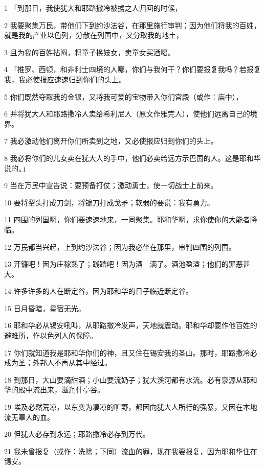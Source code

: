 \par 1 「到那日，我使犹大和耶路撒冷被掳之人归回的时候，
\par 2 我要聚集万民，带他们下到约沙法谷，在那里施行审判；因为他们将我的百姓，就是我的产业以色列，分散在列国中，又分取我的地土，
\par 3 且为我的百姓拈阄，将童子换妓女，卖童女买酒喝。
\par 4 「推罗、西顿，和非利士四境的人哪，你们与我何干？你们要报复我吗？若报复我，我必使报应速速归到你们的头上。
\par 5 你们既然夺取我的金银，又将我可爱的宝物带入你们宫殿（或作：庙中），
\par 6 并将犹大人和耶路撒冷人卖给希利尼人（原文作雅完人），使他们远离自己的境界。
\par 7 我必激动他们离开你们所卖到之地，又必使报应归到你们的头上。
\par 8 我必将你们的儿女卖在犹大人的手中，他们必卖给远方示巴国的人。这是耶和华说的。」
\par 9 当在万民中宣告说：要预备打仗；激动勇士，使一切战士上前来。
\par 10 要将犁头打成刀剑，将镰刀打成戈矛；软弱的要说：我有勇力。
\par 11 四围的列国啊，你们要速速地来，一同聚集。耶和华啊，求你使你的大能者降临。
\par 12 万民都当兴起，上到约沙法谷；因为我必坐在那里，审判四围的列国。
\par 13 开镰吧！因为庄稼熟了；践踏吧！因为酒　满了。酒池盈溢；他们的罪恶甚大。
\par 14 许多许多的人在断定谷，因为耶和华的日子临近断定谷。
\par 15 日月昏暗，星宿无光。
\par 16 耶和华必从锡安吼叫，从耶路撒冷发声，天地就震动。耶和华却要作他百姓的避难所，作以色列人的保障。
\par 17 你们就知道我是耶和华你们的神，且又住在锡安我的圣山。那时，耶路撒冷必成为圣；外邦人不再从其中经过。
\par 18 到那日，大山要滴甜酒；小山要流奶子；犹大溪河都有水流。必有泉源从耶和华的殿中流出来，滋润什亭谷。
\par 19 埃及必然荒凉，以东变为凄凉的旷野，都因向犹大人所行的强暴，又因在本地流无辜人的血。
\par 20 但犹大必存到永远；耶路撒冷必存到万代。
\par 21 我未曾报复（或作：洗除；下同）流血的罪，现在我要报复，因为耶和华住在锡安。


